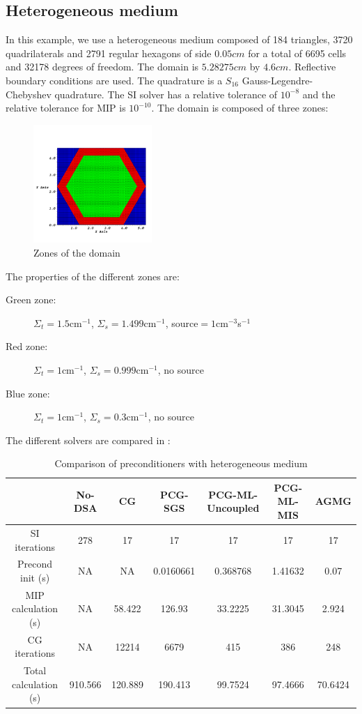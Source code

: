 \subsection{Heterogeneous medium}
In this example, we use a heterogeneous medium composed of 184 triangles, 3720
quadrilaterals and 2791 regular hexagons of side $0.05cm$ for a total of 6695 
cells and 32178 degrees of freedom. The domain is $5.28275cm$ by $4.6cm$. 
Reflective boundary conditions are used. The quadrature is a $S_{16}$ 
Gauss-Legendre-Chebyshev quadrature. The SI solver has a relative tolerance of 
$10^{-8}$ and the relative tolerance for MIP is $10^{-10}$. The domain is 
composed of three zones:
\begin{figure}[H]
\centering
\includegraphics[width=0.4\textwidth]{source_crop}
\caption{Zones of the domain}
\end{figure}
The properties of the different zones are:
\begin{description}
\item[Green zone:] $\Sigma_t =1.5$cm$^{-1}$, $\Sigma_s = 1.499$cm$^{-1}$, source$ =
1$cm$^{-3}$s$^{-1}$
\item[Red zone:] $\Sigma_t = 1$cm$^{-1}$, $\Sigma_s = 0.999$cm$^{-1}$, no source
\item[Blue zone:] $\Sigma_t = 1$cm$^{-1}$, $\Sigma_s = 0.3$cm$^{-1}$, no source
\end{description}
The different solvers are compared in :
\begin{table}[H]
  \begin{center}
    \caption{Comparison of preconditioners with heterogeneous medium}
    \begin{tabular}{|c|c|c|c|c|c|c|}
      \hline
      & No-DSA & CG & PCG-SGS & PCG-ML-Uncoupled & PCG-ML-MIS & AGMG\\
      \hline
      SI iterations & 278     & 17      & 17        & 17       & 17      & 17  \\
   Precond init (s) & NA      & NA      & 0.0160661 & 0.368768 & 1.41632 &
      0.07  \\
MIP calculation (s) & NA      & 58.422  & 126.93    & 33.2225  & 31.3045 &
      2.924 \\
      CG iterations & NA      & 12214   & 6679      & 415      & 386     & 248  \\
Total calculation (s) & 910.566 & 120.889 & 190.413 & 99.7524  & 97.4666 &
      70.6424 \\      
      \hline
    \end{tabular}
    \label{comparison_hex}
  \end{center}
\end{table}
